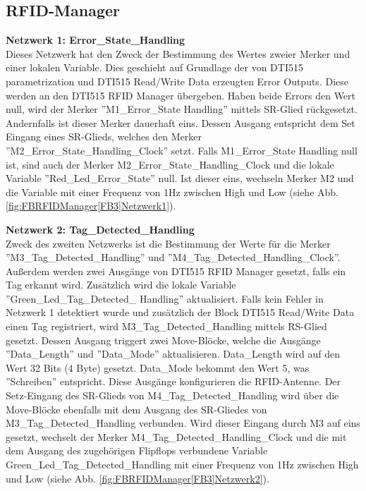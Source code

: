 \subsection*{RFID-Manager}
\label{subsec:RFID-Manager}
\textbf{Netzwerk 1: Error\_State\_Handling}\\
Dieses Netzwerk hat den Zweck der Bestimmung des Wertes zweier Merker und einer lokalen Variable. Dies geschieht auf Grundlage der von DTI515 parametrization und DTI515 Read/Write Data erzeugten Error Outputs. Diese werden an den DTI515 RFID Manager übergeben. Haben beide Errors den Wert null, wird der Merker ''M1\_Error\_State Handling'' mittels SR-Glied rückgesetzt. Andernfalls ist dieser Merker dauerhaft eins. Dessen Ausgang entspricht dem Set Eingang eines SR-Glieds, welches den Merker ''M2\_Error\_State\_Handling\_Clock'' setzt. Falls M1\_Error\_State Handling null ist, sind auch der Merker M2\_Error\_State\_Handling\_Clock und die lokale Variable ''Red\_Led\_Error\_State'' null. Ist dieser eins, wechseln Merker M2 und die Variable mit einer Frequenz von 1Hz zwischen High und Low (siehe Abb. \ref{fig:FBRFIDManager[FB3]Netzwerk1}).

\textbf{Netzwerk 2: Tag\_Detected\_Handling}\\
Zweck des zweiten Netzwerks ist die Bestimmung der Werte für die Merker ''M3\_Tag\_Detected\_Handling'' und ''M4\_Tag\_Detected\_Handling\_Clock''. Außerdem werden zwei Ausgänge von DTI515 RFID Manager gesetzt, falls ein Tag erkannt wird. Zusätzlich wird die lokale Variable ''Green\_Led\_Tag\_Detected\_ Handling'' aktualisiert. Falls kein Fehler in Netzwerk 1 detektiert wurde und zusätzlich der Block DTI515 Read/Write Data einen Tag registriert,  wird M3\_Tag\_Detected\_Handling mittels RS-Glied gesetzt. Dessen Ausgang triggert zwei Move-Blöcke, welche die Ausgänge ''Data\_Length'' und ''Data\_Mode'' aktualisieren. Data\_Length wird auf den Wert 32 Bits (4 Byte) gesetzt. Data\_Mode bekommt den Wert 5, was ''Schreiben'' entspricht. Diese Ausgänge konfigurieren die RFID-Antenne. Der Setz-Eingang des SR-Glieds von M4\_Tag\_Detected\_Handling wird über die Move-Blöcke ebenfalls mit dem Ausgang des SR-Gliedes von M3\_Tag\_Detected\_Handling verbunden. Wird dieser Eingang durch M3 auf eins gesetzt, wechselt der Merker M4\_Tag\_Detected\_Handling\_Clock und die mit dem Ausgang des zugehörigen Flipflops verbundene Variable Green\_Led\_Tag\_Detected\_Handling mit einer Frequenz von 1Hz zwischen High und Low (siehe Abb. \ref{fig:FBRFIDManager[FB3]Netzwerk2}).

